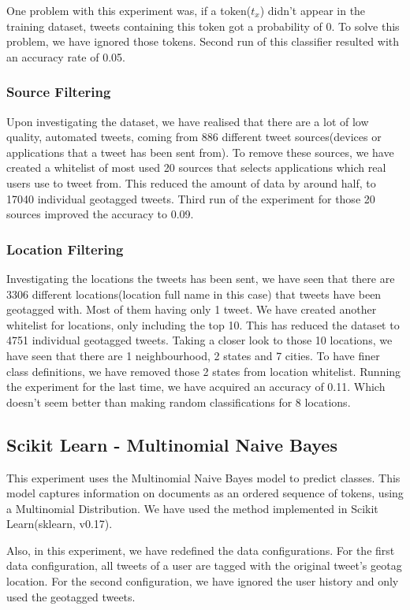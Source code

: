 \documentclass[twoside,11pt]{article}
\begin{document}
One problem with this experiment was, if a token($t_x$) didn't appear in the training dataset, tweets containing this token got a probability of 0. To solve this problem, we have ignored those tokens. Second run of this classifier resulted with an accuracy rate of 0.05.

\subsubsection{Source Filtering}
Upon investigating the dataset, we have realised that there are a lot of low quality, automated tweets, coming from 886 different tweet sources(devices or applications that a tweet has been sent from). To remove these sources, we have created a whitelist of most used 20 sources that selects applications which real users use to tweet from. This reduced the amount of data by around half, to 17040 individual geotagged tweets. Third run of the experiment for those 20 sources improved the accuracy to 0.09. 

\subsubsection{Location Filtering}
Investigating the locations the tweets has been sent, we have seen that there are 3306 different locations(location full name in this case) that tweets have been geotagged with. Most of them having only 1 tweet. We have created another whitelist for locations, only including the top 10. This has reduced the dataset to 4751 individual geotagged tweets. Taking a closer look to those 10 locations, we have seen that there are 1 neighbourhood, 2 states and 7 cities. To have finer class definitions, we have removed those 2 states from location whitelist. Running the experiment for the last time, we have acquired an accuracy of 0.11. Which doesn't seem better than making random classifications for 8 locations.

\subsection{Scikit Learn - Multinomial Naive Bayes}
This experiment uses the Multinomial Naive Bayes model to predict classes. This model captures information on documents as an ordered sequence of tokens\cite{mccallum1998comparison}, using a Multinomial Distribution. We have used the method implemented in Scikit Learn\cite{scikit-learn}(sklearn, v0.17).

Also, in this experiment, we have redefined the data configurations. For the first data configuration, all tweets of a user are tagged with the original tweet's geotag location.  For the second configuration, we have ignored the user history and only used the geotagged tweets.
\end{document}
